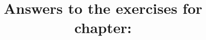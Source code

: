 \documentclass{artikel3}
\newcounter{chapter}
\begin{document}
\title{Answers to the exercises for chapter: \chaptershorttitle}
\author{}\date{}\maketitle

\TheAnswers
\end{document}
